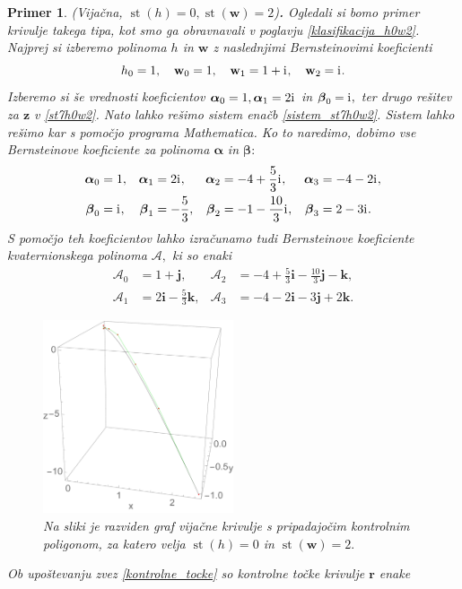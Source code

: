\documentclass[12pt,a4paper,twoside]{article}
\newcommand{\iu}{\mathrm{i}\mkern1mu} %
\theoremstyle{definition} %
\theoremstyle{plain} %
\theoremstyle{primerstyle}
\newtheorem{primer}[definicija]{Primer}
\numberwithin{equation}{section}  %
\newcommand{\rV}{\mathbf{r}}
\newcommand{\iV}{\mathbf{i}}
\newcommand{\jV}{\mathbf{j}}
\newcommand{\kV}{\mathbf{k}}
\newcommand{\wV}{\mathbf{w}}
\newcommand{\zV}{\mathbf{z}}
\newcommand{\AQ}{\mathcal{A}}
\newcommand{\balpha}{\boldsymbol \alpha}
\newcommand{\bbeta}{\boldsymbol \beta}
\DeclareMathOperator{\st}{st}
\begin{document}
\begin{primer}
	\label{primer_h0w2_vijacna}
	\textnormal{ }(Vijačna, $\st(h)=0,\st(\wV)=2$)\textbf{.}
	Ogledali si bomo primer krivulje takega tipa, kot smo ga obravnavali v poglavju \ref{klasifikacija_h0w2}. Najprej si izberemo polinoma $h$ in $\wV$ z naslednjimi Bernsteinovimi koeficienti
	$$h_0=1,\quad\wV_0=1,\quad\wV_1=1+\iu,\quad\wV_2=\iu.$$
	Izberemo si še vrednosti koeficientov $\balpha_0=1,\balpha_1=2\iu$ in $\bbeta_0=\iu,$ ter drugo rešitev za $\zV$ v \eqref{st7h0w2}. Nato lahko rešimo sistem enačb \eqref{sistem_st7h0w2}. Sistem lahko rešimo kar s pomočjo programa \emph{Mathematica}. Ko to naredimo, dobimo vse Bernsteinove koeficiente za polinoma $\balpha$ in $\bbeta:$
	\begin{align*}
		\balpha_0&=1,&\balpha_1&=2\iu,&\balpha_2&=-4+\frac{5}{3}\iu,&\balpha_3&=-4-2\iu,\\
		\bbeta_0&=\iu,&\bbeta_1&=-\frac{5}{3},&\bbeta_2&=-1-\frac{10}{3}\iu,&\bbeta_3&=2-3\iu.
	\end{align*}
	S pomočjo teh koeficientov lahko izračunamo tudi Bernsteinove koeficiente kvaternionskega polinoma $\AQ,$ ki so enaki
	\begin{align*}
		\AQ_0&=1+\jV,&\AQ_2&=-4+\frac{5}{3}\iV-\frac{10}{3}\jV-\kV,\\
		\AQ_1&=2\iV-\frac{5}{3}\kV,&\AQ_3&=-4-2\iV-3\jV+2\kV.
	\end{align*}
	\begin{figure}[h]
	  \centering
	  \includegraphics[width=0.5\textwidth]{images/h0w2_vijacna.pdf}
	  \caption[Primer vijačne krivulje ($\st(h)=0,$ $\st(\wV)=2$)]{Na sliki je razviden graf vijačne krivulje s pripadajočim kontrolnim poligonom, za katero velja $\st(h)=0$ in $\st(\wV)=2.$}
	  \label{fig:h0w2_vijacna}
	\end{figure}
	Ob upoštevanju zvez \eqref{kontrolne_tocke} so kontrolne točke krivulje $\rV$ enake

\end{primer}
\end{document}
